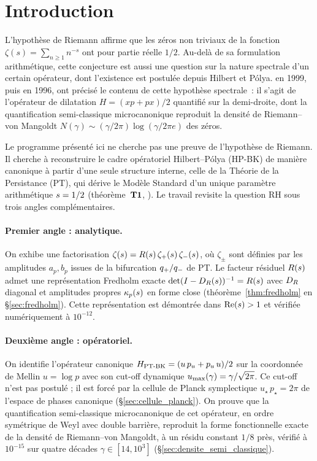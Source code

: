 \section{Introduction}
\label{sec:intro}

L'hypothèse de Riemann affirme que les zéros non triviaux de la fonction
$\zeta(s) = \sum_{n \ge 1} n^{-s}$ ont pour partie réelle $1/2$. Au-delà de
sa formulation arithmétique, cette conjecture est aussi une question sur la
nature spectrale d'un certain opérateur, dont l'existence est postulée
depuis Hilbert et Pólya. \textcite{BerryKeating1999} en 1999, puis
\textcite{Connes1996} en 1996, ont précisé le contenu de cette hypothèse
spectrale~: il s'agit de l'opérateur de dilatation
$H = (xp + px)/2$ quantifié sur la demi-droite, dont la quantification
semi-classique microcanonique reproduit la densité de Riemann--von Mangoldt
$N(\gamma) \sim (\gamma/2\pi) \log(\gamma / 2\pi e)$
des zéros.

Le programme présenté ici ne cherche pas une preuve de l'hypothèse de
Riemann. Il cherche à reconstruire le cadre opératoriel Hilbert--Pólya
(HP-BK) de manière canonique à partir d'une seule structure interne,
celle de la Théorie de la Persistance (PT), qui dérive le Modèle Standard
d'un unique paramètre arithmétique $s = 1/2$
(théorème~$\textbf{T1}$, \cite{PT_M1}). Le travail revisite la question RH sous
trois angles complémentaires.

\paragraph{Premier angle : analytique.}
On exhibe une factorisation
$\zeta(s) = R(s)\,\zeta_{+}(s)\,\zeta_{-}(s)$, où $\zeta_\pm$ sont
définies par les amplitudes $a_p, b_p$ issues de la bifurcation
$q_{+}/q_{-}$ de PT. Le facteur résiduel $R(s)$ admet une
représentation Fredholm exacte
$\det(I - D_R(s))^{-1} = R(s)$ avec $D_R$ diagonal et amplitudes
propres $\kappa_p(s)$ en forme close (théorème~\ref{thm:fredholm} en
\S\ref{sec:fredholm}). Cette représentation est démontrée dans
$\operatorname{Re}(s) > 1$ et vérifiée numériquement à $10^{-12}$.

\paragraph{Deuxième angle : opératoriel.}
On identifie l'opérateur canonique
$H_{\mathrm{PT\text{-}BK}} = (u\,p_u + p_u\,u)/2$ sur la coordonnée de Mellin $u = \log p$
avec son cut-off dynamique
$u_{\max}(\gamma) = \gamma/\sqrt{2\pi}$. Ce cut-off n'est pas postulé ; il
est forcé par la cellule de Planck symplectique $u_\star\,p_\star = 2\pi$
de l'espace de phases canonique (\S\ref{sec:cellule_planck}). On prouve
que la quantification semi-classique microcanonique de cet opérateur, en
ordre symétrique de Weyl avec double barrière, reproduit la forme
fonctionnelle exacte de la densité de Riemann--von Mangoldt, à un résidu
constant $1/8$ près, vérifié à $10^{-15}$ sur quatre décades
$\gamma \in [14, 10^{3}]$ (\S\ref{sec:densite_semi_classique}).

